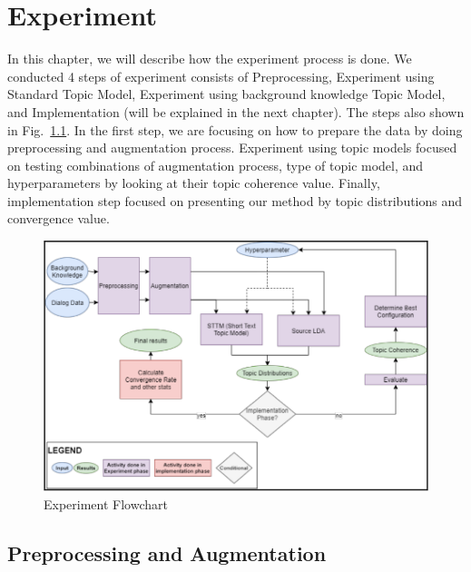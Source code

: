 \documentclass[senior]{IPSstyle}
\begin{document}
\chapter{Experiment} 
\label{chapter_3}

In this chapter, we will describe how the experiment process is done. We conducted 4 steps of experiment consists of Preprocessing, Experiment using Standard Topic Model, Experiment using background knowledge Topic Model, and Implementation (will be explained in the next chapter). The steps also shown in Fig.~\ref{fig_flow}. In the first step, we are focusing on how to prepare the data by doing preprocessing and augmentation process. Experiment using topic models focused on testing combinations of augmentation process, type of topic model, and hyperparameters by looking at their topic coherence value. Finally, implementation step focused on presenting our method by topic distributions and convergence value.

\begin{figure}[h]
	\centering
	\includegraphics[scale=0.5]{images/flowchart.png}
	\caption{Experiment Flowchart}
\label{fig_flow}
\end{figure}

\section{Preprocessing and Augmentation}
\end{document}
